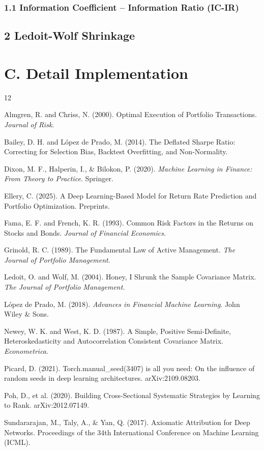 \documentclass[twoside,final]{hcmut-report}
\begin{document}
\subsubsection*{1.1 Information Coefficient -- Information Ratio (IC-IR)}
\subsection*{2 Ledoit-Wolf Shrinkage}
\label{Ledoit-Wolf_shrinkage}

\section*{C. Detail Implementation}
\newpage

\begin{thebibliography}{12}

  Almgren, R. and Chriss, N. (2000).
  Optimal Execution of Portfolio Transactions.
  \emph{Journal of Risk}.

  Bailey, D. H. and López de Prado, M. (2014).
  The Deflated Sharpe Ratio: Correcting for Selection Bias, Backtest Overfitting, and Non-Normality.

  Dixon, M. F., Halperin, I., \& Bilokon, P. (2020).
  \emph{Machine Learning in Finance: From Theory to Practice}.
  Springer.

  Ellery, C. (2025).
  A Deep Learning-Based Model for Return Rate Prediction and Portfolio Optimization.
  Preprints.

  Fama, E. F. and French, K. R. (1993).
  Common Risk Factors in the Returns on Stocks and Bonds.
  \emph{Journal of Financial Economics}.

  Grinold, R. C. (1989).
  The Fundamental Law of Active Management.
  \emph{The Journal of Portfolio Management}.

  Ledoit, O. and Wolf, M. (2004).
  Honey, I Shrunk the Sample Covariance Matrix.
  \emph{The Journal of Portfolio Management}.

  López de Prado, M. (2018).
  \emph{Advances in Financial Machine Learning}.
  John Wiley \& Sons.

  Newey, W. K. and West, K. D. (1987).
  A Simple, Positive Semi-Definite, Heteroskedasticity and Autocorrelation Consistent Covariance Matrix.
  \emph{Econometrica}.

  Picard, D. (2021).
  Torch.manual\_seed(3407) is all you need: On the influence of random seeds in deep learning architectures.
  arXiv:2109.08203.

  Poh, D., et al. (2020).
  Building Cross-Sectional Systematic Strategies by Learning to Rank.
  arXiv:2012.07149.

  Sundararajan, M., Taly, A., \& Yan, Q. (2017).
  Axiomatic Attribution for Deep Networks.
  Proceedings of the 34th International Conference on Machine Learning (ICML).

\end{thebibliography}
\end{document}
